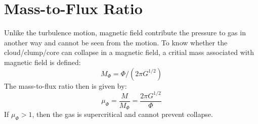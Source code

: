 \section{Mass-to-Flux Ratio}
Unlike the turbulence motion, magnetic field contribute the pressure to gas in another way and cannot be seen from the motion. To know whether the cloud/clump/core can collapse in a magnetic field, a critial mass associated with magnetic field is defined\cite{Mouschovias1976}:
\begin{equation}
    M_{\Phi} = \Phi / (2\pi G^{1/2})
\end{equation}
The mass-to-flux ratio then is given by:
\begin{equation}
    \mu_{\Phi} = \frac{M}{M_{\Phi}} = \frac{2\pi G^{1/2}}{\Phi}
\end{equation}
If $\mu_{\Phi} > 1$, then the gas is supercritical and cannot prevent collapse.








%
%
%
